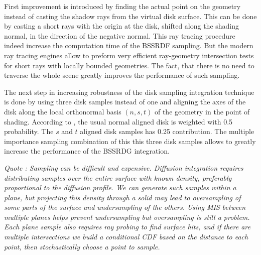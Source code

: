 First improvement is introduced by finding the actual point on the geometry instead of casting
the shadow rays from the virtual disk surface. This can be done by casting a short rays with the
origin at the disk, shifted along the shading normal, in the direction of the negative normal.
 This ray tracing procedure indeed increase the
computation time of the BSSRDF sampling. But the modern ray tracing engines allow to
preform very efficient ray-geometry intersection tests for short rays with locally bounded
geometries. The fact, that there is no need to traverse the whole scene greatly improves the
performance of such sampling.

The next step in increasing robustness of the disk sampling integration technique is done by using
three disk samples instead of one and aligning the axes of the disk along the local orthonormal
basis $(n,s,t)$ of the geometry in the point of shading. 
According to \cite{King:2013:BIS:2504459.2504520}, the usual normal aligned disk is weighted with
0.5 probability. The $s$ and $t$ aligned disk samples has 0.25 contribution. The multiple importance
sampling combination of this this three disk samples allows to greatly increase the performance of
the BSSRDG integration.

\emph{Quote \cite{Burley:disney_siggraph15}: Sampling can be difficult and expensive. Diffusion
integration requires distributing samples over the entire surface with known
density, preferably proportional to the diffusion profile. We can generate
such samples within a plane, but projecting this density through a solid may
lead to oversampling of some parts of the surface and undersampling of the
others.
Using MIS between multiple planes \cite{King:2013:BIS:2504459.2504520}  helps prevent
undersampling but oversampling is still a problem. Each plane sample also
requires ray probing to find surface hits, and if there are multiple
intersections we build a conditional CDF based on the distance to each point,
then stochastically choose a point to sample.}